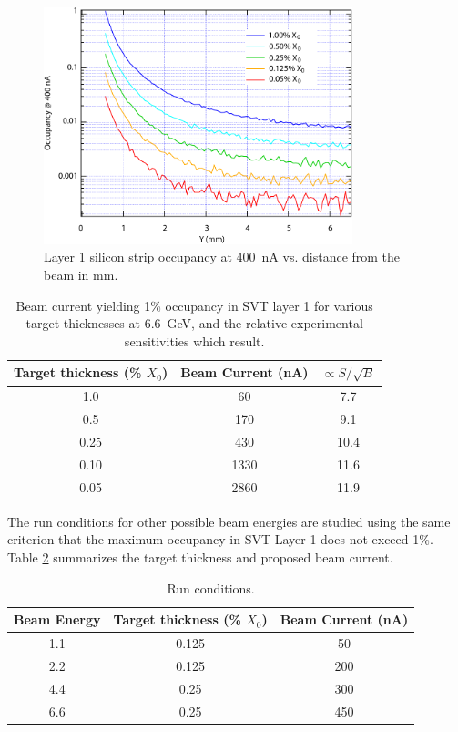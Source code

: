 \begin{figure}[t]
\includegraphics[width=0.8\textwidth]{performance/occupancy.pdf}
\caption{\small{Layer 1 silicon strip occupancy at 400~nA vs. distance from the
beam in mm.}}
\label{fig:occup}
\end{figure}

\begin{table}[h]
\begin{center}
\begin{tabular}{|c|c|c|} \hline
  Target thickness (\% $X_0$) & Beam Current (nA) & $\propto S/\sqrt{B}$ \\ \hline
  1.0 & 60 & 7.7 \\ \hline
  0.5 & 170 & 9.1 \\ \hline
  0.25 & 430 & 10.4 \\ \hline
  0.10 & 1330 & 11.6 \\ \hline
  0.05 & 2860 & 11.9 \\ \hline
\end{tabular}
\end{center}
\caption{\small{Beam current yielding 1\% occupancy in SVT layer 1 for various target 
thicknesses at 6.6~GeV, and the relative experimental sensitivities which result.}}
\label{tab:occup}
\end{table}

The run conditions for other possible beam energies are studied using the same criterion that the maximum occupancy 
in SVT Layer 1 does not exceed 1\%. Table \ref{tab:runc} summarizes the target thickness and proposed beam current. 

\begin{table}[h]
\begin{center}
\begin{tabular}{|c|c|c|} \hline
  Beam Energy & Target thickness (\% $X_0$) & Beam Current (nA) \\ \hline
  1.1 & 0.125 & 50 \\ \hline
  2.2 & 0.125 & 200 \\ \hline
  4.4 & 0.25  & 300 \\ \hline
  6.6 & 0.25 & 450 \\ \hline
\end{tabular}
\end{center}
\caption{\small{Run conditions.}}
\label{tab:runc}
\end{table}

